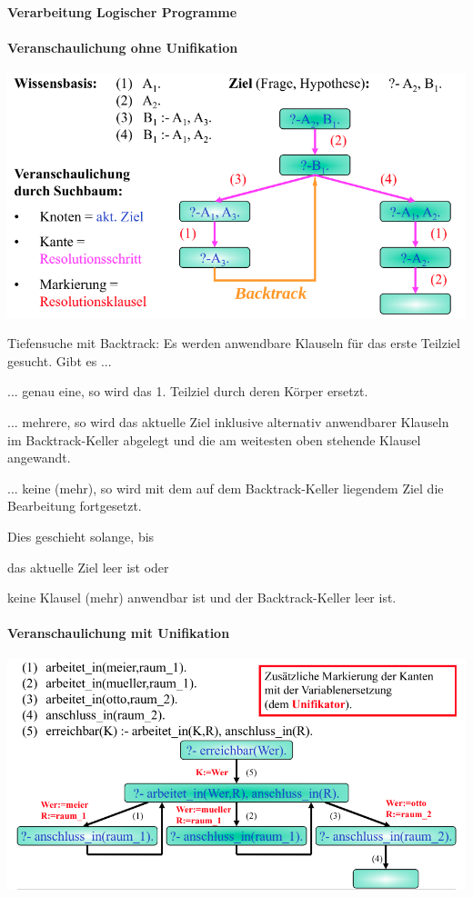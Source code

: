 \documentclass[a4paper]{article}
\begin{document}
\begin{multicols}{3}
  \paragraph{Verarbeitung Logischer Programme}
  \paragraph{Veranschaulichung ohne Unifikation}
  \includegraphics[width=.5\linewidth]{Assets/Logik-prolog-ohne-unifikation.png}

  Tiefensuche mit Backtrack:
  Es werden anwendbare Klauseln für das erste Teilziel gesucht. Gibt es ...
  \begin{itemize*}
    \item ... genau eine, so wird das 1. Teilziel durch deren Körper ersetzt.
    \item ... mehrere, so wird das aktuelle Ziel inklusive alternativ anwendbarer Klauseln im Backtrack-Keller abgelegt und die am weitesten oben stehende Klausel angewandt.
    \item ... keine (mehr), so wird mit dem auf dem Backtrack-Keller liegendem Ziel die Bearbeitung fortgesetzt.
  \end{itemize*}

  Dies geschieht solange, bis
  \begin{itemize*}
    \item das aktuelle Ziel leer ist oder
    \item keine Klausel (mehr) anwendbar ist und der Backtrack-Keller leer ist.
  \end{itemize*}


  \paragraph{Veranschaulichung mit Unifikation}
  \includegraphics[width=.5\linewidth]{Assets/Logik-prolog-mit-unifikation.png}


\end{multicols}
\end{document}
